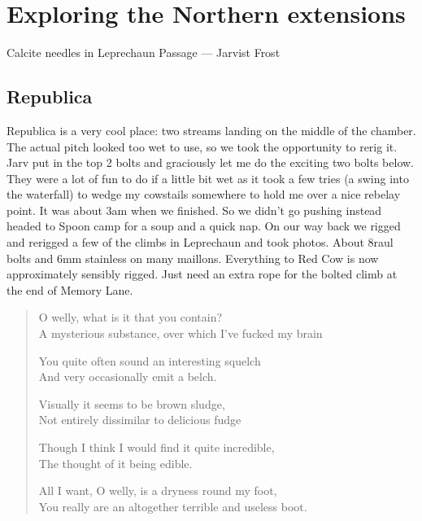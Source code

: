 \section{Exploring the Northern extensions}

\begin{marginfigure}
	\centering
         \caption{Calcite needles in Leprechaun Passage --- Jarvist Frost} 
         \label{calcite needles}
 \end{marginfigure}

\subsection{Republica} Republica is a very cool place: two streams landing on the middle of the chamber. The actual pitch looked too wet to use, so we took the opportunity to rerig it. 
Jarv put in the top 2 bolts and graciously let me do the exciting two bolts below.  They were a lot of fun to do if a little bit wet as it took a few tries (a swing into the waterfall) to wedge my cowstails somewhere to hold me over a nice rebelay point. It was about 3am when we finished. So we didn't go pushing instead headed to Spoon camp for a soup and a quick nap.  On our way back we rigged and rerigged a few of the climbs in Leprechaun and took photos. About 8raul bolts and 6mm stainless on many maillons.
Everything to Red Cow is now approximately sensibly rigged. Just need an extra rope for the bolted climb at the end of Memory Lane.




\begin{verse}
\begin{centering}
 O welly, what is it that you contain?\\
A mysterious substance, over which I've fucked my brain

You quite often sound an interesting squelch\\
And very occasionally emit a belch.

Visually it seems to be brown sludge,\\
Not entirely dissimilar to delicious fudge

Though I think I would find it quite incredible,\\
The thought of it being edible.

All I want, O welly, is a dryness round my foot, \\
You really are an altogether terrible and useless boot.\\
 \end{centering}
\end{verse}

